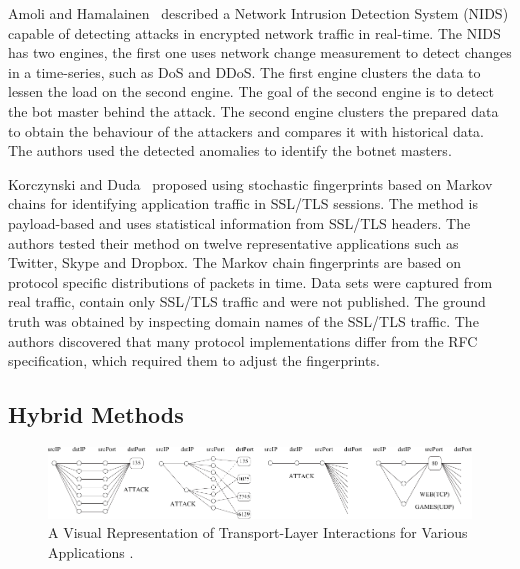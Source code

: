 Amoli and Hamalainen~\cite{Amoli-2013-real} described a Network Intrusion Detection System (NIDS) capable of detecting attacks in encrypted network traffic in real-time. The NIDS has two engines, the first one uses network change measurement to detect changes in a time-series, such as DoS and DDoS. The first engine clusters the data to lessen the load on the second engine. The goal of the second engine is to detect the bot master behind the attack. The second engine clusters the prepared data to obtain the behaviour of the attackers and compares it with historical data. The authors used the detected anomalies to identify the botnet masters.

Korczynski and Duda~\cite{Korczynski-2014-Markov} proposed using stochastic fingerprints based on Markov chains for identifying application traffic in SSL/TLS sessions. The method is payload-based and uses statistical information from SSL/TLS headers. The authors tested their method on twelve representative applications such as Twitter, Skype and Dropbox. The Markov chain fingerprints are based on protocol specific distributions of packets in time. Data sets were captured from real traffic, contain only SSL/TLS traffic and were not published. The ground truth was obtained by inspecting domain names of the SSL/TLS traffic. The authors discovered that many protocol implementations differ from the RFC specification, which required them to adjust the fingerprints.

\subsection{Hybrid Methods}\label{subsec:hybrid}

\begin{figure}[!t]
	\begin{center}
		\includegraphics[width=0.9\linewidth]{figures/graphlets}
		\caption{A Visual Representation of Transport-Layer Interactions for Various Applications \cite{Karagiannis-2005-BLINC}.}
		\label{fig:graphlets}
	\end{center}
\end{figure}

